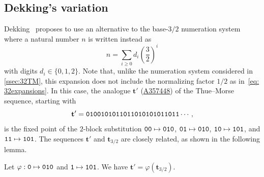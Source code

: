 \documentclass[12pt,reqno]{article}
\newcommand{\seqnum}[1]{\href{https://oeis.org/#1}{\rm \underline{#1}}}
\begin{document}

\subsection{Dekking's variation}\label{ssec:dekk}
Dekking~\cite{DekTM} proposes to use an alternative to the base-$3/2$ numeration system where a natural number $n$ is written instead as
\[
  n=\sum_{i\ge 0}d_i\left(\frac{3}{2}\right)^i
\]
with digits $d_i\in\{0,1,2\}$. Note that, unlike the numeration system considered in \cref{ssec:32TM}, this expansion does not include the normalizing factor $1/2$ as in~\cref{eq: 32expansions}. In this case, the analogue $\mathbf{t}'$ (\seqnum{A357448}) of the Thue--Morse sequence,  starting with
\[
  \mathbf{t}'={\tt 0100101011011010101011011}\cdots,
\]
is the fixed point of the $2$-block substitution
${\tt 00}\mapsto {\tt 010}$, ${\tt 01}\mapsto {\tt 010}$, ${\tt 10}\mapsto {\tt 101}$, and ${\tt 11}\mapsto {\tt 101}$. The sequences $\mathbf{t}'$ and $\mathbf{t}_{3/2}$ are closely related, as shown in the following lemma. 

\begin{lemma}\label{lem:morphic_image}
  Let $\varphi:{\tt 0}\mapsto {\tt 010}$ and ${\tt 1}\mapsto {\tt 101}$. We have
  $\mathbf{t}'=\varphi(\mathbf{t}_{3/2})$. 
\end{lemma}
\end{document}
